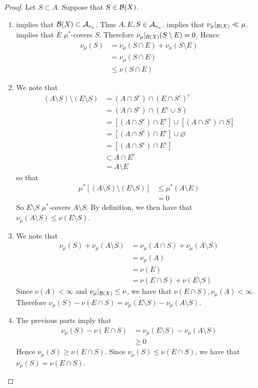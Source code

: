 \documentclass{book}
\begin{document}
	\begin{proof}
		Let $S \subset A$. Suppose that $S \in \mathcal{B}(X)$.
		\begin{enumerate}
			\item {} implies that $\mathcal{B}(X) \subset \mathcal{A}_{\nu_{\mu}}$. Thus $A, E, S \in \mathcal{A}_{\nu_{\mu}}$.  implies that $\nu_{\mu}|_{\mathcal{B}(X)} \ll \mu$.  implies that $E$ $\mu^*$-covers $S$. Therefore $\nu_{\mu}|_{\mathcal{B}(X)}(S \setminus E) = 0$. Hence
			\begin{align*}
				\nu_{\mu}(S) 
				& = \nu_{\mu}(S \cap E) + \nu_{\mu}(S \setminus E) \\
				& = \nu_{\mu}(S \cap E) \\
				& \leq \nu(S \cap E) 
			\end{align*}
			\item We note that 
			\begin{align*}
				(A \setminus S) \setminus (E \setminus S) 
				& = (A \cap S^c) \cap (E \cap S^c)^c \\
				& = (A \cap S^c) \cap (E^c \cup S) \\
				& = [(A \cap S^c) \cap E^c] \cup [(A \cap S^c) \cap S] \\
				& = [(A \cap S^c) \cap E^c] \cup \varnothing \\
				& = [(A \cap S^c) \cap E^c] \\
				& \subset A \cap E^c \\
				& = A \setminus E
			\end{align*}
			so that 
			\begin{align*}
				\mu^*[(A \setminus S) \setminus (E \setminus S) ]
				& \leq \mu^*(A \setminus E) \\
				& = 0
			\end{align*}
			So $E \setminus S$ $\mu^*$-covers $A \setminus S$. By definition, we then have that $\nu_{\mu}(A \setminus S) \leq \nu(E \setminus S)$.
			\item We note that
			\begin{align*}
				\nu_{\mu}(S) + \nu_{\mu}(A \setminus S)
				& = \nu_{\mu}(A \cap S) + \nu_{\mu}(A \setminus S) \\
				& = \nu_{\mu}(A) \\
				& = \nu(E) \\
				& =\nu(E \cap S) + \nu(E \setminus S)
			\end{align*}
			Since $\nu(A) < \infty$ and $\nu_{\mu}|_{\mathcal{B}(X)} \leq \nu$, we have that $\nu(E \cap S), \nu_{\mu}(A) < \infty$. Therefore $\nu_{\mu}(S) - \nu(E \cap S) = \nu_{\mu}(E \setminus S) - \nu_{\mu}(A \setminus S)$.
			\item The previous parts imply that 
			\begin{align*}
				\nu_{\mu}(S) - \nu(E \cap S)
				& = \nu_{\mu}(E \setminus S) - \nu_{\mu}(A \setminus S) \\
				& \geq 0
			\end{align*}
			Hence $\nu_{\mu}(S) \geq \nu(E \cap S)$. Since $\nu_{\mu}(S) \leq \nu(E \cap S)$, we have that $\nu_{\mu}(S) = \nu(E \cap S)$.
		\end{enumerate}
	\end{proof}
\end{document}
